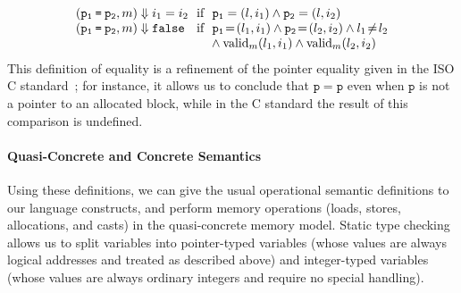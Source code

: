 \[\begin{array}{@{}l@{~}l@{}}
(\mathtt{p_1 \mathbin{\texttt{=}} p_2}, m) \Downarrow i_1 = i_2 & \text{ if }~ \mathtt{p_1} = (l, i_1) \land \mathtt{p_2} = (l, i_2) \\
(\mathtt{p_1 \mathbin{\texttt{=}} p_2}, m) \Downarrow \texttt{false} & \text{ if }~ 
\mathtt{p_1} \!=\! (l_1, i_1) \land \mathtt{p_2} \!=\! (l_2, i_2) \land l_1 \!\neq\! l_2 \\
  & \quad{}~ \land \text{valid}_m(l_1,i_1) \land \text{valid}_m(l_2,i_2) \\
\end{array}
\]
This definition of equality is a refinement of the pointer equality given in the ISO C standard~\cite{iso2011iec}; for instance, it allows us to conclude that $\mathtt{p = p}$ even when $\mathtt{p}$ is not a pointer to an allocated block, while in the C standard the result of this comparison is undefined.

\paragraph{Quasi-Concrete and Concrete Semantics}
Using these definitions, we can give the usual operational semantic definitions to our language constructs, and perform memory operations (loads, stores, allocations, and casts) in the quasi-concrete memory model. Static type checking allows us to split variables into pointer-typed variables (whose values are %
always logical addresses
and treated as described above) and integer-typed variables (whose values are always ordinary integers and require no special handling). 

